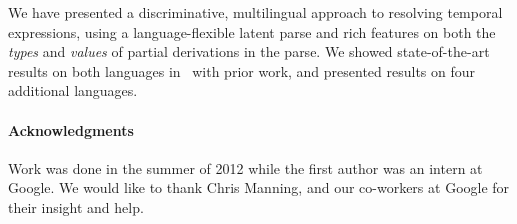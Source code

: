 We have presented a discriminative, multilingual approach to resolving
  temporal expressions, using a language-flexible latent parse and rich
  features on both the \textit{types} and \textit{values} of partial
  derivations in the parse.
We showed state-of-the-art results on both languages in \tempeval\ with prior
  work, and presented results on four additional languages.

\vspace{0.75cm}

\paragraph{Acknowledgments}
Work was done in the summer of 2012 while the first author was an intern at
  Google.
We would like to thank Chris Manning, and our co-workers at Google for their
  insight and help.
